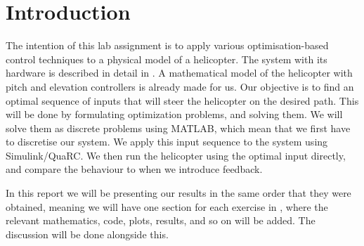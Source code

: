\section{Introduction}

The intention of this lab assignment is to apply various optimisation-based control techniques to a physical model of a helicopter. The system with its hardware is described in detail in \cite{_helicopter_2015}. A mathematical model of the helicopter with pitch and elevation controllers is already made for us. Our objective is to find an optimal sequence of inputs that will steer the helicopter on the desired path. This will be done by formulating optimization problems, and solving them. We will solve them as discrete problems using MATLAB, which mean that we first have to discretise our system. We apply this input sequence to the system using Simulink/QuaRC. We then run the helicopter using the optimal input directly, and compare the behaviour to when we introduce feedback.

In this report we will be presenting our results in the same order that they were obtained, meaning we will have one section for each exercise in \cite{_helicopter_2015}, where the relevant mathematics, code, plots, results, and so on will be added. The discussion will be done alongside this.